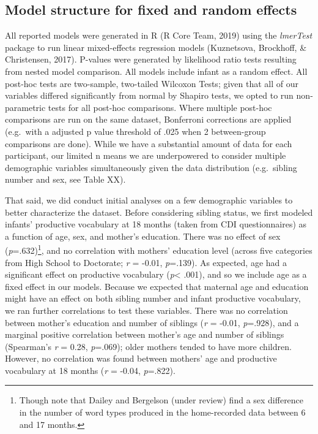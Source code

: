 \documentclass[
  english,
  man,floatsintext]{apa6}
\begin{document}
\hypertarget{model-structure-for-fixed-and-random-effects}{%
\subsection{Model structure for fixed and random effects}\label{model-structure-for-fixed-and-random-effects}}

All reported models were generated in R (R Core Team, 2019) using the \emph{lmerTest} package to run linear mixed-effects regression models (Kuznetsova, Brockhoff, \& Christensen, 2017). P-values were generated by likelihood ratio tests resulting from nested model comparison. All models include infant as a random effect. All post-hoc tests are two-sample, two-tailed Wilcoxon Tests; given that all of our variables differed significantly from normal by Shapiro tests, we opted to run non-parametric tests for all post-hoc comparisons. Where multiple post-hoc comparisons are run on the same dataset, Bonferroni corrections are applied (e.g.~with a adjusted p value threshold of .025 when 2 between-group comparisons are done). While we have a substantial amount of data for each participant, our limited n means we are underpowered to consider multiple demographic variables simultaneously given the data distribution (e.g.~sibling number and sex, see Table XX).

That said, we did conduct initial analyses on a few demographic variables to better characterize the dataset. Before considering sibling status, we first modeled infants' productive vocabulary at 18 months (taken from CDI questionnaires) as a function of age, sex, and mother's education. There was no effect of sex (\emph{p}=.632)\footnote{Though note that Dailey and Bergelson (under review) find a sex difference in the number of word types produced in the home-recorded data between 6 and 17 months.}, and no correlation with mothers' education level (across five categories from High School to Doctorate; \emph{r} = -0.01, \emph{p}=.139). As expected, age had a significant effect on productive vocabulary (\emph{p}\textless{} .001), and so we include age as a fixed effect in our models. Because we expected that maternal age and education might have an effect on both sibling number and infant productive vocabulary, we ran further correlations to test these variables. There was no correlation between mother's education and number of siblings (\emph{r} = -0.01, \emph{p}=.928), and a marginal positive correlation between mother's age and number of siblings (Spearman's \emph{r} = 0.28, \emph{p}=.069); older mothers tended to have more children. However, no correlation was found between mothers' age and productive vocabulary at 18 months (\emph{r} = -0.04, \emph{p}=.822).
\end{document}
